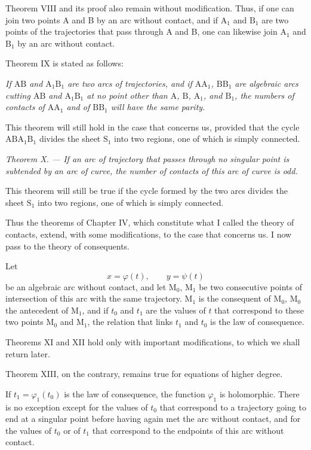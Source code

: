 \documentclass[11pt]{article}
\begin{document}
Theorem VIII and its proof also remain without modification. Thus, if one can join two points A and B by an arc without contact, and if $\mathrm{A}_1$ and $\mathrm{B}_1$ are two points of the trajectories that pass through A and B, one can likewise join $\mathrm{A}_1$ and $\mathrm{B}_1$ by an arc without contact.

Theorem IX is stated as follows:

\emph{If $\mathrm{AB}$ and $\mathrm{A}_1\mathrm{B}_1$ are two arcs of trajectories, and if $\mathrm{AA}_1$, $\mathrm{BB}_1$ are algebraic arcs cutting $\mathrm{AB}$ and $\mathrm{A}_1\mathrm{B}_1$ at no point other than $\mathrm{A}$, $\mathrm{B}$, $\mathrm{A}_1$, and $\mathrm{B}_1$, the numbers of contacts of $\mathrm{AA}_1$ and of $\mathrm{BB}_1$ will have the same parity.}

This theorem will still hold in the case that concerns us, provided that the cycle $\mathrm{ABA}_1\mathrm{B}_1$ divides the sheet $\mathrm{S}_1$ into two regions, one of which is simply connected.

\emph{Theorem X. — If an arc of trajectory that passes through no singular point is subtended by an arc of curve, the number of contacts of this arc of curve is odd.}

This theorem will still be true if the cycle formed by the two arcs divides the sheet $\mathrm{S}_1$ into two regions, one of which is simply connected.

Thus the theorems of Chapter IV, which constitute what I called the theory of contacts, extend, with some modifications, to the case that concerns us. I now pass to the theory of consequents.

Let
\[
x=\varphi(t),\qquad y=\psi(t)
\]
be an algebraic arc without contact, and let $\mathrm{M}_0$, $\mathrm{M}_1$ be two consecutive points of intersection of this arc with the same trajectory. $\mathrm{M}_1$ is the consequent of $\mathrm{M}_0$, $\mathrm{M}_0$ the antecedent of $\mathrm{M}_1$, and if $t_0$ and $t_1$ are the values of $t$ that correspond to these two points $\mathrm{M}_0$ and $\mathrm{M}_1$, the relation that links $t_1$ and $t_0$ is the law of consequence.

Theorems XI and XII hold only with important modifications, to which we shall return later.

Theorem XIII, on the contrary, remains true for equations of higher degree.

If $t_1=\varphi_1(t_0)$ is the law of consequence, the function $\varphi_1$ is holomorphic. There is no exception except for the values of $t_0$ that correspond to a trajectory going to end at a singular point before having again met the arc without contact, and for the values of $t_0$ or of $t_1$ that correspond to the endpoints of this arc without contact.
\end{document}
